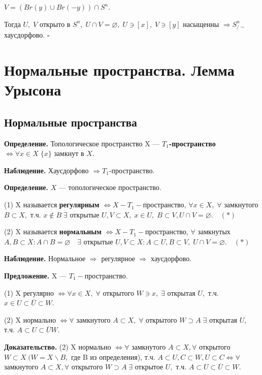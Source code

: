 \documentclass[12pt,a4paper]{article}
\begin{document}
$V = (Br(y) \cup Br(-y)) \cap S^{n}.$

Тогда $U, \; V$ открыто в $S^{n}, \; U \cap V = \varnothing, \; U \ni [x], \; V \ni [y]$ насыщенны $\Rightarrow S^{n}_{/\sim}$ хаусдорфово. $\square$

\section{Нормальные пространства. Лемма Урысона}

\subsection{Нормальные пространства}

\textbf{Определение.} Топологическое пространство X --- \textbf{$T_{1}$-пространство} $\Leftrightarrow \forall x \in X \; \{x\}$ замкнут в $X.$

\textbf{Наблюдение.} Хаусдорфово $\Rightarrow T_{1}$-пространство.

\textbf{Определение.} $X$ --- топологическое пространство. 

(1) X называется \textbf{регулярным} $\Leftrightarrow X - T_{1}-$пространство, $\forall x \in X, \; \forall$ замкнутого $B \subset X,$ т.ч. $x \notin B \; \exists$ открытые $U, V \subset X, \; x \in U, \; B \subset V, U \cap V = \varnothing. \quad (*)$

(2) X называется \textbf{нормальным} $\Leftrightarrow X - T_{1}-$пространство, $\forall$ замкнутых $A, B \subset X\!: A \cap B = \varnothing \quad \exists$ открытые $U, V \subset X\!: A \subset U, B \subset V, \; U \cap V = \varnothing. \quad (*)$

\textbf{Наблюдение.} Нормальное $\Rightarrow$ регулярное $\Rightarrow$ хаусдорфово.

\textbf{Предложение.} X --- $T_{1}-$пространство.

(1) X регулярно $\Leftrightarrow \forall x \in X, \; \forall$ открытого $W \ni x, \; \exists$ открытая $U,$ т.ч. $x \in U \subset \overline{U} \subset W.$

(2) X нормально $\Leftrightarrow \forall$ замкнутого $A \subset X, \; \forall$ открытого $W \supset A \; \exists$ открытая $U,$ т.ч. $A \subset U \subset \overline{U} W.$

\textbf{Доказательство.} (2) X нормально $\Leftrightarrow \forall$ замкнутого $A \subset X, \forall$ открытого $W \subset X \; (W = X \backslash B,$ где B из определения), т.ч. $A \subset U, C \subset W, U \subset C \Leftrightarrow \forall$ замкнутого $A \subset X, \forall$ открытого $W \supset A \; \exists$ открытое $U,$ т.ч. $A \subset U \subset \overline{U} \subset W.$
\end{document}

